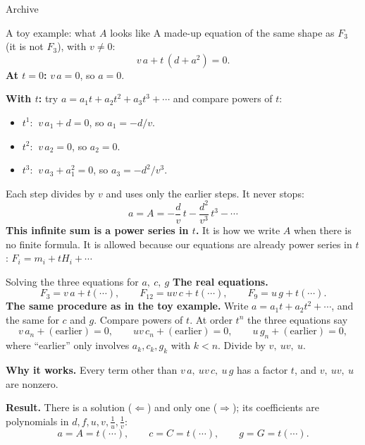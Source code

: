 \begin{frame}
\centering
{\Huge Archive}
\end{frame}

\begin{frame}{A toy example: what \(A\) looks like}
A made-up equation of the same shape as \(F_3\) (it is not \(F_3\)), with \(v\ne0\):
\[
\boxed{v\,a+t\,(d+a^2)=0.}
\]
\textbf{At \(t=0\):} \(v\,a=0\), so \(a=0\).
\par\smallskip
\textbf{With \(t\):} try \(a=a_1t+a_2t^2+a_3t^3+\cdots\) and compare powers of \(t\):
\begin{itemize}
\setlength{\itemsep}{2pt}
\item \(t^1\): \(\ v\,a_1+d=0\), so \(a_1=-d/v\).
\item \(t^2\): \(\ v\,a_2=0\), so \(a_2=0\).
\item \(t^3\): \(\ v\,a_3+a_1^2=0\), so \(a_3=-d^2/v^3\).
\end{itemize}
Each step divides by \(v\) and uses only the earlier steps. It never stops:
\[
a=A=-\frac dv\,t-\frac{d^2}{v^3}\,t^3-\cdots
\]
\textbf{This infinite sum is a power series in \(t\).} It is how we write \(A\) when there is no finite formula. It is allowed because our equations are already power series in \(t\): \(F_i=m_i+tH_i+\cdots\)
\end{frame}

\begin{frame}{Solving the three equations for \(a,\ c,\ g\)}
\textbf{The real equations.}
\[
F_3=v\,a+t(\cdots),\qquad F_{12}=uv\,c+t(\cdots),\qquad F_9=u\,g+t(\cdots).
\]
\textbf{The same procedure as in the toy example.} Write \(a=a_1t+a_2t^2+\cdots\), and the same for \(c\) and \(g\). Compare powers of \(t\). At order \(t^n\) the three equations say
\[
v\,a_n+(\text{earlier})=0,\qquad uv\,c_n+(\text{earlier})=0,\qquad u\,g_n+(\text{earlier})=0,
\]
where ``earlier'' only involves \(a_k,c_k,g_k\) with \(k<n\). Divide by \(v,\ uv,\ u\).
\par\smallskip
\textbf{Why it works.} Every term other than \(v\,a,\ uv\,c,\ u\,g\) has a factor \(t\), and \(v,\ uv,\ u\) are nonzero.
\par\smallskip
\textbf{Result.} There is a solution (\(\Leftarrow\)) and only one (\(\Rightarrow\)); its coefficients are polynomials in \(d,f,u,v,\tfrac1u,\tfrac1v\):
\[
\boxed{a=A=t(\cdots),\qquad c=C=t(\cdots),\qquad g=G=t(\cdots).}
\]
\end{frame}

